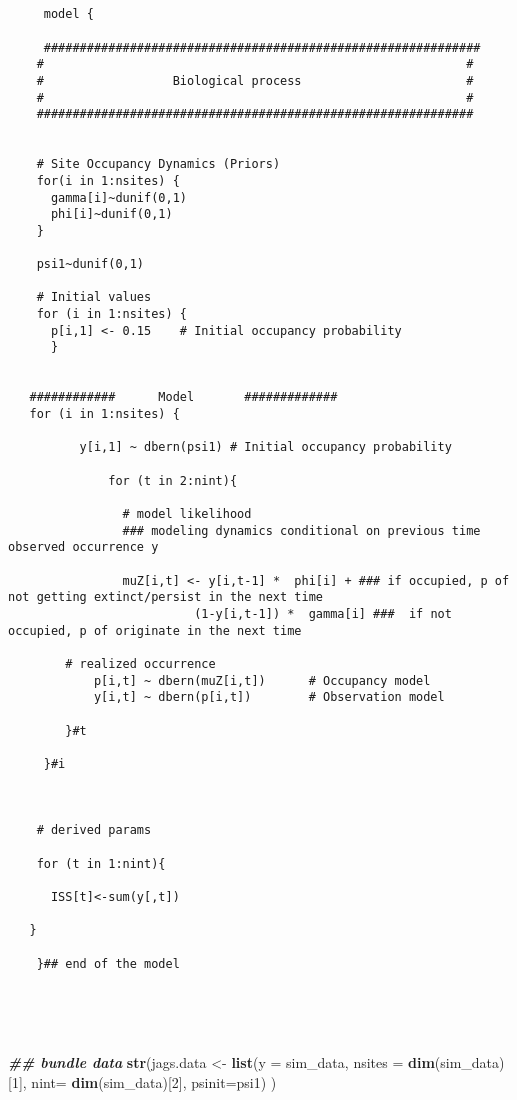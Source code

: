 \documentclass[
]{article}
\newenvironment{Shaded}{\begin{snugshade}}{\end{snugshade}}
\newcommand{\AttributeTok}[1]{\textcolor[rgb]{0.13,0.29,0.53}{#1}}
\newcommand{\DecValTok}[1]{\textcolor[rgb]{0.00,0.00,0.81}{#1}}
\newcommand{\DocumentationTok}[1]{\textcolor[rgb]{0.56,0.35,0.01}{\textbf{\textit{#1}}}}
\newcommand{\FunctionTok}[1]{\textcolor[rgb]{0.13,0.29,0.53}{\textbf{#1}}}
\newcommand{\NormalTok}[1]{#1}
\newcommand{\OtherTok}[1]{\textcolor[rgb]{0.56,0.35,0.01}{#1}}
\begin{document}
\begin{verbatim}

   
     model {
    
     #############################################################
    #                                                           #
    #                  Biological process                       #
    #                                                           #
    #############################################################
    
    
    # Site Occupancy Dynamics (Priors)
    for(i in 1:nsites) {
      gamma[i]~dunif(0,1)
      phi[i]~dunif(0,1)
    }
    
    psi1~dunif(0,1)     
         
    # Initial values
    for (i in 1:nsites) {
      p[i,1] <- 0.15    # Initial occupancy probability
      }
    

   ############      Model       #############
   for (i in 1:nsites) {
      
          y[i,1] ~ dbern(psi1) # Initial occupancy probability
    
              for (t in 2:nint){
            
                # model likelihood
                ### modeling dynamics conditional on previous time observed occurrence y
                
                muZ[i,t] <- y[i,t-1] *  phi[i] + ### if occupied, p of not getting extinct/persist in the next time
                          (1-y[i,t-1]) *  gamma[i] ###  if not occupied, p of originate in the next time
                
        # realized occurrence
            p[i,t] ~ dbern(muZ[i,t])      # Occupancy model
            y[i,t] ~ dbern(p[i,t])        # Observation model
    
        }#t
      
     }#i
    
    
    
    # derived params
    
    for (t in 1:nint){
    
      ISS[t]<-sum(y[,t])
    
   }
    
    }## end of the model
    
    
    
    
\end{verbatim}

\begin{Shaded}
\begin{Highlighting}[]
\DocumentationTok{\#\# bundle data}
\FunctionTok{str}\NormalTok{(jags.data }\OtherTok{\textless{}{-}} \FunctionTok{list}\NormalTok{(}\AttributeTok{y =}\NormalTok{ sim\_data,}
                      \AttributeTok{nsites =} \FunctionTok{dim}\NormalTok{(sim\_data)[}\DecValTok{1}\NormalTok{],}
                      \AttributeTok{nint=} \FunctionTok{dim}\NormalTok{(sim\_data)[}\DecValTok{2}\NormalTok{],}
                      \AttributeTok{psinit=}\NormalTok{psi1)}
\NormalTok{)}
\end{Highlighting}
\end{Shaded}
\end{document}
